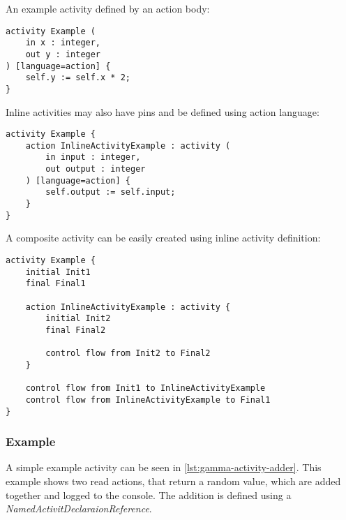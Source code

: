An example activity defined by an action body:

\begin{lstlisting}[language=activity]
activity Example (
	in x : integer,
	out y : integer
) [language=action] {
	self.y := self.x * 2;
}
\end{lstlisting}

Inline activities may also have pins and be defined using action language:

\begin{lstlisting}[language=activity]
activity Example {
	action InlineActivityExample : activity (
		in input : integer,
		out output : integer
	) [language=action] {
		self.output := self.input;
	}
}
\end{lstlisting}

A composite activity can be easily created using inline activity definition:

\begin{lstlisting}[language=activity]
activity Example {
	initial Init1
	final Final1
	
	action InlineActivityExample : activity {
		initial Init2
		final Final2
		
		control flow from Init2 to Final2
	}

	control flow from Init1 to InlineActivityExample
	control flow from InlineActivityExample to Final1
}
\end{lstlisting}

\subsubsection{Example}

A simple example activity can be seen in \autoref{lst:gamma-activity-adder}. This example shows two read actions, that return a random value, which are added together and logged to the console. The addition is defined using a \emph{NamedActivitDeclaraionReference}.


